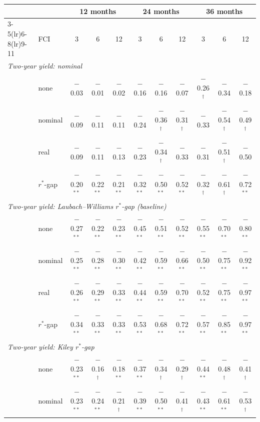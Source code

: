 \begin{tabular}{llccccccccc}
\toprule
 & & \multicolumn{3}{c}{12 months} & \multicolumn{3}{c}{24 months} & \multicolumn{3}{c}{36 months}\\
\cmidrule(lr){3-5}\cmidrule(lr){6-8}\cmidrule(lr){9-11}
 & FCI & 3 & 6 & 12 & 3 & 6 & 12 & 3 & 6 & 12 \\
\midrule
\multicolumn{11}{l}{\textit{Two-year yield: nominal}}\\
 & none & $-$0.03 & $-$0.01 & $-$0.02 & $-$0.16 & $-$0.16 & $-$0.07 & $-$0.26$^{\dagger}$ & $-$0.34 & $-$0.18 \\
 & nominal & $-$0.09 & $-$0.11 & $-$0.11 & $-$0.24 & $-$0.36$^{\dagger}$ & $-$0.31$^{\dagger}$ & $-$0.33 & $-$0.54$^{\dagger}$ & $-$0.49$^{\dagger}$ \\
 & real & $-$0.09 & $-$0.11 & $-$0.13 & $-$0.23 & $-$0.34$^{\dagger}$ & $-$0.33 & $-$0.31 & $-$0.51$^{\dagger}$ & $-$0.50 \\
 & $r^*$-gap & $-$0.20$^{**}$ & $-$0.22$^{**}$ & $-$0.21$^{**}$ & $-$0.32$^{**}$ & $-$0.50$^{**}$ & $-$0.52$^{**}$ & $-$0.32$^{\dagger}$ & $-$0.61$^{\dagger}$ & $-$0.72$^{**}$ \\
\midrule
\multicolumn{11}{l}{\textit{Two-year yield: Laubach--Williams $r^*$-gap (baseline)}}\\
 & none & $-$0.27$^{**}$ & $-$0.22$^{**}$ & $-$0.23$^{**}$ & $-$0.45$^{**}$ & $-$0.51$^{**}$ & $-$0.52$^{**}$ & $-$0.55$^{**}$ & $-$0.70$^{**}$ & $-$0.80$^{**}$ \\
 & nominal & $-$0.25$^{**}$ & $-$0.28$^{**}$ & $-$0.30$^{**}$ & $-$0.42$^{**}$ & $-$0.59$^{**}$ & $-$0.66$^{**}$ & $-$0.50$^{**}$ & $-$0.75$^{**}$ & $-$0.92$^{**}$ \\
 & real & $-$0.26$^{**}$ & $-$0.29$^{**}$ & $-$0.33$^{**}$ & $-$0.44$^{**}$ & $-$0.59$^{**}$ & $-$0.70$^{**}$ & $-$0.52$^{**}$ & $-$0.75$^{**}$ & $-$0.97$^{**}$ \\
 & $r^*$-gap & $-$0.34$^{**}$ & $-$0.33$^{**}$ & $-$0.33$^{**}$ & $-$0.53$^{**}$ & $-$0.68$^{**}$ & $-$0.72$^{**}$ & $-$0.57$^{**}$ & $-$0.85$^{**}$ & $-$0.97$^{**}$ \\
\midrule
\multicolumn{11}{l}{\textit{Two-year yield: Kiley $r^*$-gap}}\\
 & none & $-$0.23$^{**}$ & $-$0.16$^{\dagger}$ & $-$0.18$^{**}$ & $-$0.37$^{**}$ & $-$0.34$^{\dagger}$ & $-$0.29$^{\dagger}$ & $-$0.44$^{**}$ & $-$0.48$^{\dagger}$ & $-$0.41$^{\dagger}$ \\
 & nominal & $-$0.23$^{**}$ & $-$0.24$^{**}$ & $-$0.21$^{\dagger}$ & $-$0.39$^{**}$ & $-$0.50$^{**}$ & $-$0.41$^{\dagger}$ & $-$0.43$^{**}$ & $-$0.61$^{**}$ & $-$0.53$^{\dagger}$ \\

\end{tabular}
